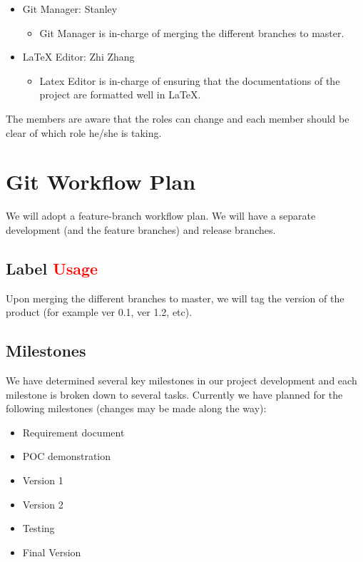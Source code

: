 \documentclass{article}
\begin{document}
\begin{itemize}
    \item Git Manager: Stanley
    \begin{itemize}
        \item Git Manager is in-charge of merging the different branches to master.
    \end{itemize}
\end{itemize}

\begin{itemize}
    \item LaTeX Editor: Zhi Zhang
    \begin{itemize}
        \item Latex Editor is in-charge of ensuring that the documentations of the project are formatted well in LaTeX.
    \end{itemize}
\end{itemize}

The members are aware that the roles can change and each member should be clear of which role he/she is taking.

\section{Git Workflow Plan}
We will adopt a feature-branch workflow plan. We will have a separate development (and the feature branches) and release branches.

\subsection{Label \textcolor{red}{Usage}}
Upon merging the different branches to master, we will tag the version of the product (for example ver 0.1, ver 1.2, etc).

\subsection{Milestones}
We have determined several key milestones in our project development and each milestone is broken down to several tasks. Currently we have planned for the following milestones (changes may be made along the way):
\begin{itemize}
    \item Requirement document
    \item POC demonstration
    \item Version 1
    \item Version 2
    \item Testing
    \item Final Version
\end{itemize}
\end{document}
